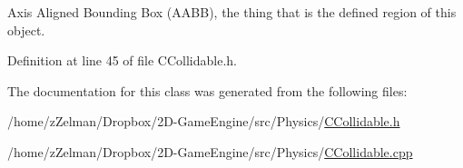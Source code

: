 Axis Aligned Bounding Box (A\-A\-B\-B), the thing that is the defined region of this object. 



Definition at line 45 of file C\-Collidable.\-h.



The documentation for this class was generated from the following files\-:\begin{DoxyCompactItemize}
\item 
/home/z\-Zelman/\-Dropbox/2\-D-\/\-Game\-Engine/src/\-Physics/\hyperlink{CCollidable_8h}{C\-Collidable.\-h}\item 
/home/z\-Zelman/\-Dropbox/2\-D-\/\-Game\-Engine/src/\-Physics/\hyperlink{CCollidable_8cpp}{C\-Collidable.\-cpp}\end{DoxyCompactItemize}
